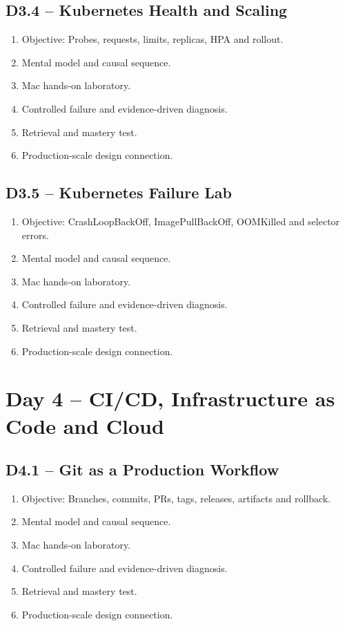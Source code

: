 \documentclass[11pt,a4paper]{book}
\begin{document}
\section{D3.4 -- Kubernetes Health and Scaling}
\begin{enumerate}
\item Objective: Probes, requests, limits, replicas, HPA and rollout.
\item Mental model and causal sequence.
\item Mac hands-on laboratory.
\item Controlled failure and evidence-driven diagnosis.
\item Retrieval and mastery test.
\item Production-scale design connection.
\end{enumerate}
\section{D3.5 -- Kubernetes Failure Lab}
\begin{enumerate}
\item Objective: CrashLoopBackOff, ImagePullBackOff, OOMKilled and selector errors.
\item Mental model and causal sequence.
\item Mac hands-on laboratory.
\item Controlled failure and evidence-driven diagnosis.
\item Retrieval and mastery test.
\item Production-scale design connection.
\end{enumerate}
\chapter{Day 4 -- CI/CD, Infrastructure as Code and Cloud}
\section{D4.1 -- Git as a Production Workflow}
\begin{enumerate}
\item Objective: Branches, commits, PRs, tags, releases, artifacts and rollback.
\item Mental model and causal sequence.
\item Mac hands-on laboratory.
\item Controlled failure and evidence-driven diagnosis.
\item Retrieval and mastery test.
\item Production-scale design connection.
\end{enumerate}
\end{document}
